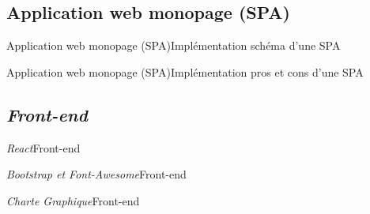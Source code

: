 \documentclass[usenames,dvipsnames]{beamer}
\begin{document}
\subsection{Application web monopage (SPA)}
\begin{frame}{Application web monopage (SPA)}{Implémentation}
schéma d'une SPA
\end{frame}

\begin{frame}{Application web monopage (SPA)}{Implémentation}
pros et cons d'une SPA
\end{frame}
\subsection{\protect\textit{Front-end}}
\begin{frame}{\textit{React}}{Front-end}

\end{frame}
\begin{frame}{\textit{Bootstrap et Font-Awesome}}{Front-end}

\end{frame}
\begin{frame}{\textit{Charte Graphique}}{Front-end}

\end{frame}
\end{document}
